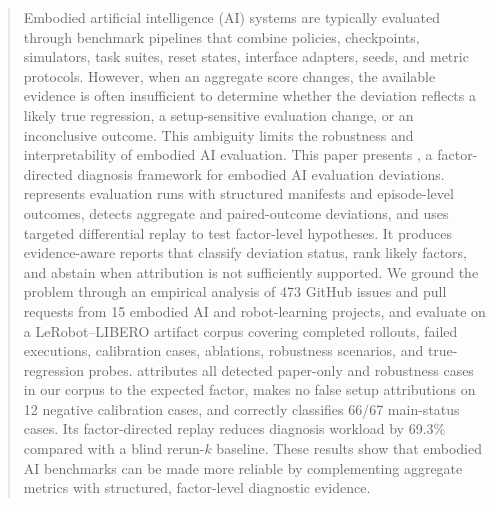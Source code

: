 \begin{abstract}
Embodied artificial intelligence (AI) systems are typically evaluated through benchmark pipelines that combine policies, checkpoints, simulators, task suites, reset states, interface adapters, seeds, and metric protocols. However, when an aggregate score changes, the available evidence is often insufficient to determine whether the deviation reflects a likely true regression, a setup-sensitive evaluation change, or an inconclusive outcome. This ambiguity limits the robustness and interpretability of embodied AI evaluation. This paper presents \sys, a factor-directed diagnosis framework for embodied AI evaluation deviations. \sys represents evaluation runs with structured manifests and episode-level outcomes, detects aggregate and paired-outcome deviations, and uses targeted differential replay to test factor-level hypotheses. It produces evidence-aware reports that classify deviation status, rank likely factors, and abstain when attribution is not sufficiently supported. We ground the problem through an empirical analysis of 473 GitHub issues and pull requests from 15 embodied AI and robot-learning projects, and evaluate \sys on a LeRobot--LIBERO artifact corpus covering completed rollouts, failed executions, calibration cases, ablations, robustness scenarios, and true-regression probes. \sys attributes all detected paper-only and robustness cases in our corpus to the expected factor, makes no false setup attributions on 12 negative calibration cases, and correctly classifies 66/67 main-status cases. Its factor-directed replay reduces diagnosis workload by 69.3\% compared with a blind rerun-$k$ baseline. These results show that embodied AI benchmarks can be made more reliable by complementing aggregate metrics with structured, factor-level diagnostic evidence.
\end{abstract}
